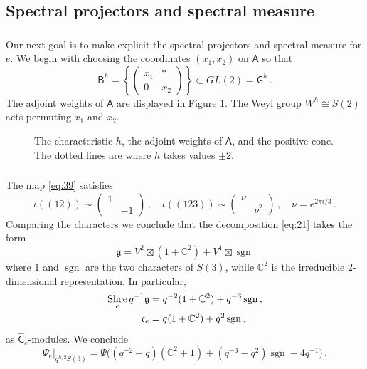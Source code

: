 \documentclass[14pt]{extarticle}
\newcommand{\C}{\mathbb{C}}
\newcommand{\bA}{\mathsf{A}}
\newcommand{\bG}{\mathsf{G}}
\newcommand{\bCh}{\widehat{\mathsf{C}}}
\newcommand{\bB}{\mathsf{B}}
\newcommand{\fg}{\mathfrak{g}}
\newcommand{\fc}{\mathfrak{c}}
\DeclareMathOperator{\sgn}{sgn}
\DeclareMathOperator{\Slice}{Slice}
\theoremstyle{definition}
\begin{document}
\subsection{Spectral projectors and spectral measure}

\subsubsection{}

Our next goal is to make explicit the spectral projectors and spectral
measure for $e$. We begin with choosing the coordinates $(x_1,x_2)$ on $\bA$ so that
%
\begin{equation}
\bB^h = \left\{
  \begin{pmatrix}
    x_1 & * \\
    0 & x_2 
  \end{pmatrix} \right\} \subset GL(2) = \bG^h \,.
\label{eq:73}
\end{equation}
%
The adjoint weights of $\bA$ are displayed in Figure \ref{f_example_g2_I}. 
The Weyl group $W^h\cong S(2)$ acts permuting $x_1$ and $x_2$.

\begin{figure}[!h]
  \centering
  \def\svgwidth{7.7cm}
 \caption{The characteristic $h$, the adjoint weights of $\bA$, and
   the positive cone. The dotted lines are where $h$ takes values $\pm
 2$.}
\label{f_example_g2_I}
\end{figure}

\subsubsection{}

The map \eqref{eq:39} satisfies 
 \begin{equation}
 \iota((12)) \sim \begin{pmatrix}
    1 \\
    & -1 
  \end{pmatrix}\,, \quad \iota((123)) \sim \begin{pmatrix}
    \nu \\
    & \nu^2 
  \end{pmatrix} \,, \quad \nu=e^{2\pi i/3} \,.
\label{eq:77}
\end{equation}
%
Comparing the characters we conclude that the decomposition
\eqref{eq:21} takes the form
%
\begin{equation}
  \label{eq:40}
  \fg = V^2 \boxtimes (1 + \C^2) + V^4 \boxtimes \sgn
\end{equation}
%
where $1$ and $\sgn$ are the two characters of $S(3)$, while
$\C^2$ is the irreducible 2-dimensional representation. 
In particular,
%
\begin{align}
  \Slice_e q^{-1} \fg &= q^{-2} (1 + \C^2) + q^{-3} \sgn\,,  \notag \\
  \fc_e &= q (1 + \C^2) + q^2 \sgn \,, 
  \label{eq:58}
\end{align}
%
as $\bCh_e$-modules. We conclude
%
\begin{equation}
  \label{eq:59}
  \Psi_e \Big|_{q^{h/2} S(3)} = \Psi\Big((q^{-2}-q) (\C^2 +1) + (q^{-3}-q^2) \sgn -4
  q^{-1}\Big)\,. 
\end{equation}
\end{document}
